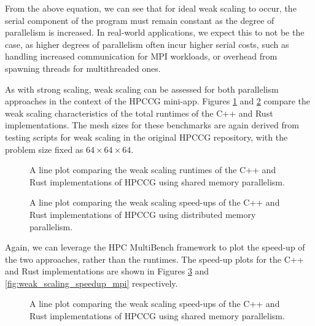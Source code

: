 From the above equation, we can see that for ideal weak scaling to occur, the serial component of the program must remain constant as the degree of parallelism is increased. In real-world applications, we expect this to not be the case, as higher degrees of parallelism often incur higher serial costs, such as handling increased communication for MPI workloads, or overhead from spawning threads for multithreaded ones.

As with strong scaling, weak scaling can be assessed for both parallelism approaches in the context of the HPCCG mini-app. Figures \ref{fig:weak_scaling_threaded} and \ref{fig:weak_scaling_mpi} compare the weak scaling characteristics of the total runtimes of the C++ and Rust implementations. The mesh sizes for these benchmarks are again derived from testing scripts for weak scaling in the original HPCCG repository, with the problem size fixed as $64 \times 64 \times 64$.

\begin{figure}[H]
    \centering
    
    \caption{A line plot comparing the weak scaling runtimes of the C++ and Rust implementations of HPCCG using shared memory parallelism.}
    \label{fig:weak_scaling_threaded}
\end{figure}

\begin{figure}[H]
    \centering
    
    \caption{A line plot comparing the weak scaling speed-ups of the C++ and Rust implementations of HPCCG using distributed memory parallelism.}
    \label{fig:weak_scaling_mpi}
\end{figure}

Again, we can leverage the HPC MultiBench framework to plot the speed-up of the two approaches, rather than the runtimes. The speed-up plots for the C++ and Rust implementations are shown in Figures \ref{fig:weak_scaling_speedup_threaded} and \ref{fig:weak_scaling_speedup_mpi} respectively.

\begin{figure}[H]
    \centering
    
    \caption{A line plot comparing the weak scaling speed-ups of the C++ and Rust implementations of HPCCG using shared memory parallelism.}
    \label{fig:weak_scaling_speedup_threaded}
\end{figure}

